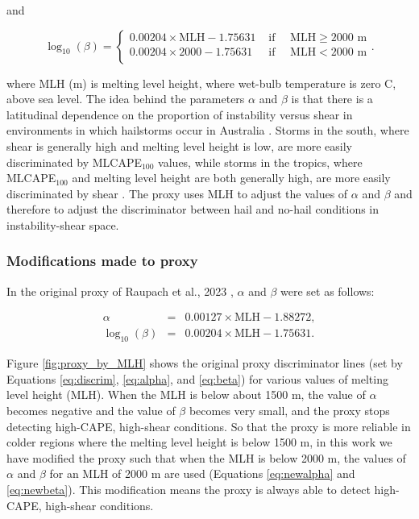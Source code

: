 \documentclass[pdflatex, sn-nature]{sn-jnl}\usepackage[]{graphicx}\usepackage[]{xcolor}
\begin{document}
and 

\begin{equation}
\log_{10}(\beta) =
    \begin{cases}
    0.00204 \times \textrm{MLH} - 1.75631 & \textrm{ if }\quad\textrm{MLH} \geq 2000 \textrm{ m} \\
    0.00204 \times 2000 - 1.75631 & \textrm{ if }\quad\textrm{MLH} < 2000 \textrm{ m} \\
    \end{cases}.
    \label{eq:newbeta}
\end{equation}

\noindent where MLH (m) is melting level height, where wet-bulb temperature is
zero C, above sea level. The idea behind the parameters $\alpha$ and $\beta$ is
that there is a latitudinal dependence on the proportion of instability versus
shear in environments in which hailstorms occur in Australia
\citep{Raupach_MWR_2023}. Storms in the south, where shear is generally high and
melting level height is low, are more easily discriminated by MLCAPE$_{100}$
values, while storms in the tropics, where MLCAPE$_{100}$ and melting level
height are both generally high, are more easily discriminated by shear
\citep{Raupach_MWR_2023}. The proxy uses MLH to adjust the values of $\alpha$
and $\beta$ and therefore to adjust the discriminator between hail and no-hail
conditions in instability-shear space. 

\subsubsection{Modifications made to proxy}

In the original proxy of Raupach et al., 2023 \cite{Raupach_MWR_2023}, $\alpha$
and $\beta$ were set as follows:

\begin{eqnarray}
\alpha & = & 0.00127 \times \textrm{MLH} - 1.88272, \label{eq:alpha} \\
\log_{10}(\beta) & = & 0.00204 \times \textrm{MLH} - 1.75631. \label{eq:beta}
\end{eqnarray}

Figure \ref{fig:proxy_by_MLH} shows the original proxy \citep{Raupach_MWR_2023}
discriminator lines (set by Equations \ref{eq:discrim}, \ref{eq:alpha}, and
\ref{eq:beta}) for various values of melting level height (MLH). When the MLH is
below about 1500 m, the value of $\alpha$ becomes negative and the value of
$\beta$ becomes very small, and the proxy stops detecting high-CAPE, high-shear
conditions. So that the proxy is more reliable in colder regions where the
melting level height is below 1500 m, in this work we have modified the proxy
such that when the MLH is below 2000 m, the values of $\alpha$ and $\beta$ for
an MLH of 2000 m are used (Equations \ref{eq:newalpha} and \ref{eq:newbeta}).
This modification means the proxy is always able to detect high-CAPE, high-shear
conditions.
\end{document}
